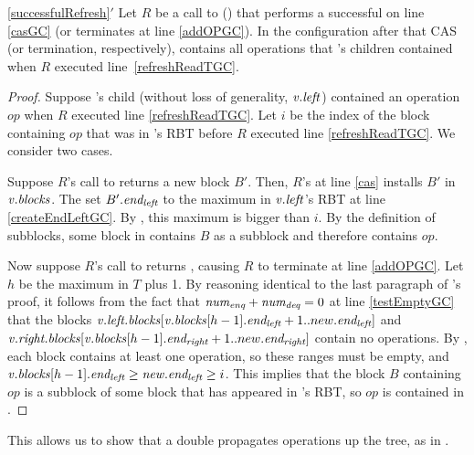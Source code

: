 \begin{customlemma}{\ref{successfulRefresh}$'$}
\label{successfulRefreshGC}
Let $R$ be a call to () that performs a successful  on line \ref{casGC} (or terminates at line \ref{addOPGC}).
In the configuration after that CAS (or termination, respectively),  contains all operations that 's children contained 
when $R$ executed line~\ref{refreshReadTGC}.
\end{customlemma}
\begin{proof}
Suppose 's child (without loss of generality, $\mbox{\textnormal{\textit{v}}}.\mbox{\textit{left}}$) contained an operation $op$ 
when $R$ executed line \ref{refreshReadTGC}.
Let $i$ be the index of the block containing $op$ that was in 's RBT before 
$R$ executed line \ref{refreshReadTGC}.
We consider two cases.

Suppose $R$'s call to  returns a new block $B'$.  Then, $R$'s  at line \ref{cas} 
installs $B'$ in $\mbox{\textnormal{\textit{v}}}.\mbox{\textit{blocks}}$.
The  set $B'.\mbox{\textit{end\textsubscript{left}}}$ to the maximum  in $\mbox{\textnormal{\textit{v}}}.\mbox{\textit{left}}$'s RBT at line \ref{createEndLeftGC}.
By , this maximum  is bigger than $i$.
By the definition of subblocks, some block in  contains $B$ as a subblock
and therefore  contains $op$.

Now suppose $R$'s call to  returns \nl, causing $R$ to terminate at line \ref{addOPGC}.
Let $h$ be the maximum  in $T$ plus 1.
By reasoning identical to the last paragraph of 's proof,
it follows from the fact that $\mbox{\textnormal{\textit{num\textsubscript{enq}}}}+\mbox{\textnormal{\textit{num\textsubscript{deq}}}}=0$ at line \ref{testEmptyGC}
that the blocks $\mbox{\textnormal{\textit{v}}}.\mbox{\textit{left.blocks}}[\mbox{\textnormal{\textit{v}}}.\mbox{\textit{blocks}}[h-1].\mbox{\textit{end\textsubscript{left}}}+1..new.\mbox{\textit{end\textsubscript{left}}}]$ and
$\mbox{\textnormal{\textit{v}}}.\mbox{\textit{right.blocks}}[\mbox{\textnormal{\textit{v}}}.\mbox{\textit{blocks}}[h-1].\mbox{\textit{end\textsubscript{right}}}+1..new.\mbox{\textit{end\textsubscript{right}}}]$
contain no operations.
By , each block contains at least one operation, so
these ranges must be empty, and $\mbox{\textnormal{\textit{v}}}.\mbox{\textit{blocks}}[h-1].\mbox{\textit{end\textsubscript{left}}} \geq \mbox{\textnormal{\textit{new}}}.\mbox{\textit{end\textsubscript{left}}}\geq i$.
This implies that the block $B$ containing $op$ is a subblock of some block that has appeared
in 's RBT, so $op$ is contained in .
\end{proof}

This allows us to show that a double  propagates operations up the tree, 
as in .

